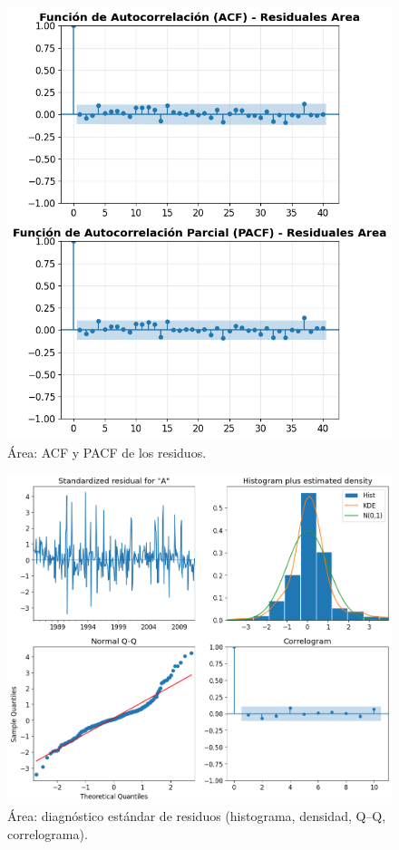 \begin{figure}[H]\centering
\includegraphics[scale=.52]{Figures/acf_pacf_res_area.png}
\caption{Área: ACF y PACF de los residuos.}
\label{fig:acf_pacf_res_area}
\end{figure}

\begin{figure}[H]\centering
\includegraphics[scale=.52]{Figures/res_std_area.png}
\caption{Área: diagnóstico estándar de residuos (histograma, densidad, Q--Q, correlograma).}
\label{fig:std_area}
\end{figure}

